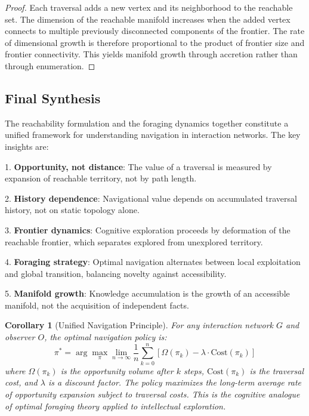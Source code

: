 \documentclass[12pt,oneside]{article}
\newtheorem{corollary}[definition]{Corollary}
\theoremstyle{remark}
\begin{document}
\begin{proof}
Each traversal adds a new vertex and its neighborhood to the reachable set. The dimension of the reachable manifold increases when the added vertex connects to multiple previously disconnected components of the frontier. The rate of dimensional growth is therefore proportional to the product of frontier size and frontier connectivity. This yields manifold growth through accretion rather than through enumeration.
\end{proof}

\subsection{Final Synthesis}

The reachability formulation and the foraging dynamics together constitute a unified framework for understanding navigation in interaction networks. The key insights are:

1. \textbf{Opportunity, not distance}: The value of a traversal is measured by expansion of reachable territory, not by path length.

2. \textbf{History dependence}: Navigational value depends on accumulated traversal history, not on static topology alone.

3. \textbf{Frontier dynamics}: Cognitive exploration proceeds by deformation of the reachable frontier, which separates explored from unexplored territory.

4. \textbf{Foraging strategy}: Optimal navigation alternates between local exploitation and global transition, balancing novelty against accessibility.

5. \textbf{Manifold growth}: Knowledge accumulation is the growth of an accessible manifold, not the acquisition of independent facts.

\begin{corollary}[Unified Navigation Principle]
For any interaction network \(G\) and observer \(O\), the optimal navigation policy is:
\[
\pi^* = \arg\max_{\pi} \lim_{n \to \infty} \frac{1}{n} \sum_{k=0}^{n} \left[ \Omega(\pi_k) - \lambda \cdot \text{Cost}(\pi_k) \right]
\]
where \(\Omega(\pi_k)\) is the opportunity volume after \(k\) steps, \(\text{Cost}(\pi_k)\) is the traversal cost, and \(\lambda\) is a discount factor. The policy maximizes the long-term average rate of opportunity expansion subject to traversal costs. This is the cognitive analogue of optimal foraging theory applied to intellectual exploration.
\end{corollary}
\end{document}
